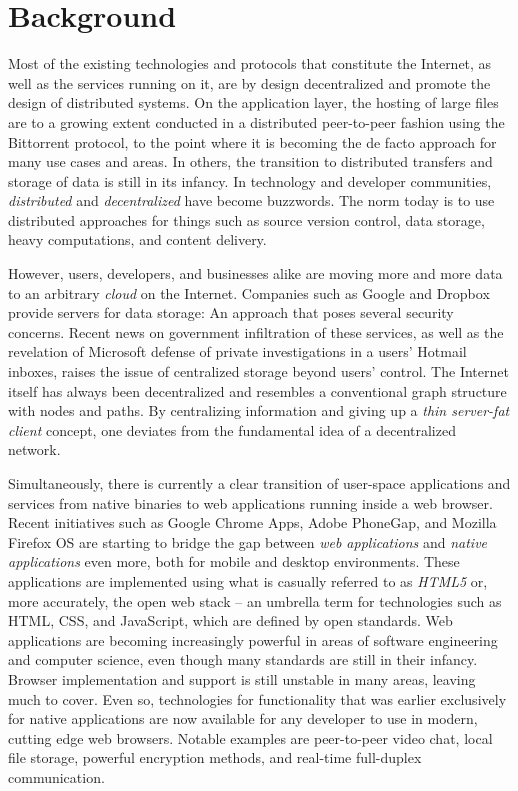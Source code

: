 \section{Background}

Most of the existing technologies and protocols that constitute the Internet, as well as the services running on it, are by design decentralized and promote the design of distributed systems\cite{InternetDecenterlized:Online}. On the application layer, the hosting of large files are to a growing extent conducted in a distributed peer-to-peer fashion using the Bittorrent protocol, to the point where it is becoming the de facto approach for many use cases and areas. In others, the transition to distributed transfers and storage of data is still in its infancy. In technology and developer communities, \emph{distributed} and \emph{decentralized} have become buzzwords. The norm today is to use distributed approaches for things such as source version control, data storage, heavy computations, and content delivery.

However, users, developers, and businesses alike are moving more and more data to an arbitrary \emph{cloud} on the Internet. Companies such as Google and Dropbox provide servers for data storage: An approach that poses several security concerns. Recent news on government infiltration of these services, as well as the revelation of Microsoft defense of private investigations in a users' Hotmail inboxes\cite{Frank:2014}, raises the issue of centralized storage beyond users' control. The Internet itself has always been decentralized and resembles a conventional graph structure with nodes and paths. By centralizing information and giving up a \emph{thin server-fat client} concept, one deviates from the fundamental idea of a decentralized network.

Simultaneously, there is currently a clear transition of user-space applications and services from native binaries to web applications running inside a web browser. Recent initiatives such as Google Chrome Apps, Adobe PhoneGap, and Mozilla Firefox OS are starting to bridge the gap between \emph{web applications} and \emph{native applications} even more, both for mobile and desktop environments. These applications are implemented using what is casually referred to as \emph{HTML5} or, more accurately, the open web stack – an umbrella term for technologies such as HTML, CSS, and JavaScript, which are defined by open standards. Web applications are becoming increasingly powerful in areas of software engineering and computer science, even though many standards are still in their infancy. Browser implementation and support is still unstable in many areas, leaving much to cover. Even so, technologies for functionality that was earlier exclusively for native applications are now available for any developer to use in modern, cutting edge web browsers. Notable examples are peer-to-peer video chat, local file storage, powerful encryption methods, and real-time full-duplex communication.

